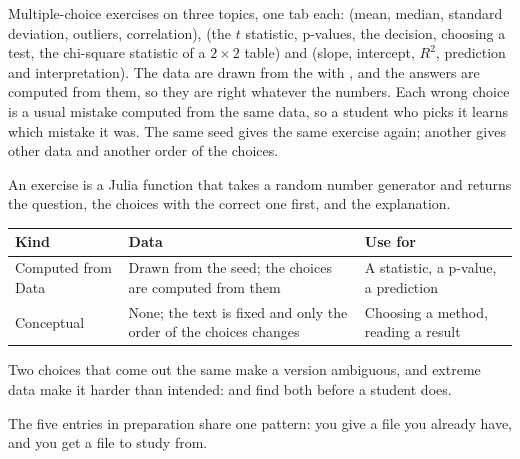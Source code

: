 Multiple-choice exercises on three topics, one tab each:  (mean, median,
standard deviation, outliers, correlation),  (the $t$ statistic, p-values, the
decision, choosing a test, the chi-square statistic of a $2\times 2$ table) and 
(slope, intercept, $R^2$, prediction and interpretation). The data are drawn from the  with
, and the answers are computed from
them, so they are right whatever the numbers. Each wrong choice is a usual mistake computed from the same
data, so a student who picks it learns which mistake it was. The same seed gives the same exercise again;
another gives other data and another order of the choices.

An exercise is a Julia function that takes a random number generator and returns the question, the choices
with the correct one first, and the explanation.

\medskip
{\small
\begin{tabularx}{\linewidth}{@{}>{\raggedright\arraybackslash}p{30mm}>{\raggedright\arraybackslash}p{58mm}X@{}}
\toprule
\textbf{Kind} & \textbf{Data} & \textbf{Use for} \\\midrule
Computed from Data & Drawn from the seed; the choices are computed from them & A statistic, a p-value, a prediction \\
Conceptual & None; the text is fixed and only the order of the choices changes & Choosing a method, reading a result \\\bottomrule
\end{tabularx}}

\medskip
Two choices that come out the same make a version ambiguous, and extreme data make it harder than intended:
 and  find both before a student
does.

The five entries in preparation share one pattern: you give a file you already have, and you get a file to
study from.

